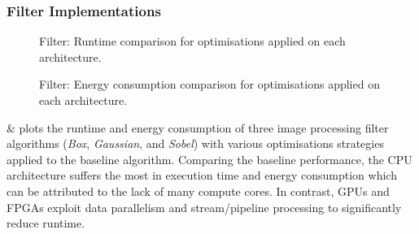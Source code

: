  \subsubsection{Filter Implementations}
\begin{figure}[!h]
    \centering
\resizebox{\columnwidth}{!}{}    %
    \caption[Filter: Runtime comparison for optimisations]{Filter: Runtime comparison for optimisations applied on each architecture.  }
    \label{fig:FilterRuntime}
\end{figure}


\begin{figure}[!h]
    \centering
\resizebox{\columnwidth}{!}{}    %
    \caption[Filter: Energy consumption comparison]{Filter: Energy consumption comparison for optimisations applied on each architecture.}
    \label{fig:FilterEnergy}
\end{figure}



  \&  plots the runtime and energy consumption of three image processing filter algorithms (\textit{Box}, \textit{Gaussian}, and \textit{Sobel}) with various optimisations strategies applied to the baseline algorithm. Comparing the baseline performance, the CPU architecture suffers the most in execution time and energy consumption which can be attributed to the lack of many compute cores. In contrast, GPUs and FPGAs exploit data parallelism and stream/pipeline processing to significantly reduce runtime. 

